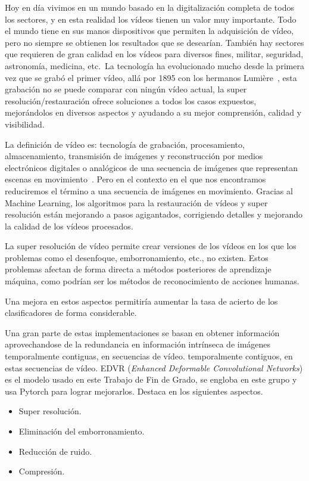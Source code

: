 
Hoy en día vivimos en un mundo basado en la digitalización completa de todos los sectores, y en esta realidad los vídeos tienen un valor muy importante. Todo el mundo tiene en sus manos dispositivos que permiten la adquisición de vídeo, pero no siempre se obtienen los resultados que se desearían. También hay sectores que requieren de gran calidad en los vídeos para diversos fines, militar, seguridad, astronomía, medicina, etc.\
La tecnología ha evolucionado mucho desde la primera vez que se grabó el primer vídeo, allá por 1895 con los hermanos Lumière~\cite{Salas_Murillo_2010}, esta grabación no se puede comparar con ningún  vídeo actual, la super resolución/restauración  ofrece soluciones a todos los casos expuestos, mejorándolos en diversos aspectos y ayudando a su mejor comprensión, calidad y visibilidad. 

 La definición de vídeo es:  tecnología de grabación, procesamiento, almacenamiento, transmisión de imágenes y reconstrucción por medios electrónicos digitales o analógicos de una secuencia de imágenes que representan escenas en movimiento~\cite{wiki:video}. Pero en el contexto en el que nos encontramos reduciremos el término  a una secuencia de imágenes en movimiento. Gracias al Machine Learning, los algoritmos para la restauración de vídeos y super resolución  están  mejorando a pasos agigantados, corrigiendo detalles y mejorando la calidad de los vídeos procesados. 
 
 La super resolución de vídeo permite crear versiones de los vídeos en los que los problemas como el desenfoque, emborronamiento, etc., no existen. Estos problemas afectan de forma directa a métodos posteriores de aprendizaje máquina, como podrían ser los métodos de reconocimiento de acciones humanas.

Una mejora en estos aspectos permitiría aumentar la tasa de acierto de los clasificadores de forma considerable.
 
 Una gran parte de estas implementaciones se basan en obtener información aprovechandose de la redundancia en información intrínseca de imágenes temporalmente contiguas, en secuencias de vídeo. temporalmente contiguos, en estas secuencias de vídeo. EDVR (\emph{Enhanced Deformable Convolutional Networks}) es el modelo usado en este Trabajo de Fin de Grado, se engloba en este grupo y usa Pytorch para lograr mejorarlos. Destaca en los siguientes aspectos.

\begin{itemize}
	\item Super resolución.
	\item Eliminación del emborronamiento.
	\item Reducción de ruido.
	\item Compresión.
\end{itemize}

